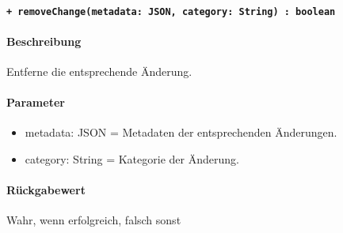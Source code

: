 \paragraph{\texttt{+ removeChange(metadata: JSON, category: String) : boolean}}\label{AP_Framework_removeChange}%
\paragraph*{Beschreibung}
Entferne die entsprechende Änderung.
\paragraph*{Parameter}
\begin{itemize}
    \item metadata: JSON = Metadaten der entsprechenden Änderungen.
    \item category: String = Kategorie der Änderung.
\end{itemize}
\paragraph*{Rückgabewert}
Wahr, wenn erfolgreich, falsch sonst